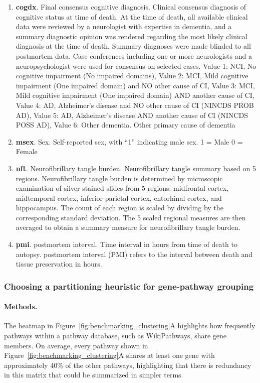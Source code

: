 \documentclass[12pt]{article}
\begin{document}
\begin{enumerate}
    \item \textbf{cogdx}. Final consensus cognitive diagnosis. Clinical consensus diagnosis of cognitive status at time of death. At the time of death, all available clinical data were reviewed by a neurologist with expertise in dementia, and a summary diagnostic opinion was rendered regarding the most likely clinical diagnosis at the time of death. Summary diagnoses were made blinded to all postmortem data. Case conferences including one or more neurologists and a neuropsychologist were used for consensus on selected cases. Value 1: NCI, No cognitive impairment (No impaired domains), Value 2: MCI, Mild cognitive impairment (One impaired domain) and NO other cause of CI, Value 3: MCI, Mild cognitive impairment (One impaired domain) AND another cause of CI, Value 4: AD, Alzheimer’s disease and NO other cause of CI (NINCDS PROB AD), Value 5: AD, Alzheimer’s disease AND another cause of CI (NINCDS POSS AD), Value 6: Other dementia. Other primary cause of dementia
    \item \textbf{msex}. Sex. Self-reported sex, with “1” indicating male sex. 1 = Male 0 = Female
    \item \textbf{nft}. Neurofibrillary tangle burden. Neurofibrillary tangle summary based on 5 regions. Neurofibrillary tangle burden is determined by microscopic examination of silver-stained slides from 5 regions: midfrontal cortex, midtemporal cortex, inferior parietal cortex, entorhinal cortex, and hippocampus. The count of each region is scaled by dividing by the corresponding standard deviation. The 5 scaled regional measures are then averaged to obtain a summary measure for neurofibrillary tangle burden.
    \item \textbf{pmi}. postmortem interval. Time interval in hours from time of death to autopsy. postmortem interval (PMI) refers to the interval between death and tissue preservation in hours.
\end{enumerate}
 \clearpage
\subsubsection{Choosing a partitioning heuristic for gene-pathway grouping}
\paragraph{Methods.}
The heatmap in Figure~\ref{fig:benchmarking_clustering}A highlights how frequently pathways within a pathway database, such as WikiPathways, share gene members. On average, every pathway shown in Figure~\ref{fig:benchmarking_clustering}A shares at least one gene with approximately 40\% of the other pathways, highlighting that there is redundancy in this matrix that could be summarized in simpler terms.
\end{document}
